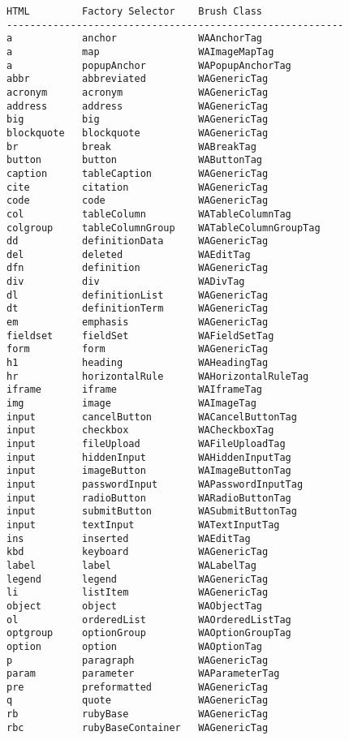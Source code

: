 \documentclass[a4paper,10pt,twoside]{book}
\begin{document}
\begin{lstlisting}
HTML         Factory Selector    Brush Class
----------------------------------------------------------
a            anchor              WAAnchorTag
a            map                 WAImageMapTag
a            popupAnchor         WAPopupAnchorTag
abbr         abbreviated         WAGenericTag
acronym      acronym             WAGenericTag
address      address             WAGenericTag
big          big                 WAGenericTag
blockquote   blockquote          WAGenericTag
br           break               WABreakTag
button       button              WAButtonTag
caption      tableCaption        WAGenericTag
cite         citation            WAGenericTag
code         code                WAGenericTag
col          tableColumn         WATableColumnTag
colgroup     tableColumnGroup    WATableColumnGroupTag
dd           definitionData      WAGenericTag
del          deleted             WAEditTag
dfn          definition          WAGenericTag
div          div                 WADivTag
dl           definitionList      WAGenericTag
dt           definitionTerm      WAGenericTag
em           emphasis            WAGenericTag
fieldset     fieldSet            WAFieldSetTag
form         form                WAGenericTag
h1           heading             WAHeadingTag
hr           horizontalRule      WAHorizontalRuleTag
iframe       iframe              WAIframeTag
img          image               WAImageTag
input        cancelButton        WACancelButtonTag
input        checkbox            WACheckboxTag
input        fileUpload          WAFileUploadTag
input        hiddenInput         WAHiddenInputTag
input        imageButton         WAImageButtonTag
input        passwordInput       WAPasswordInputTag
input        radioButton         WARadioButtonTag
input        submitButton        WASubmitButtonTag
input        textInput           WATextInputTag
ins          inserted            WAEditTag
kbd          keyboard            WAGenericTag
label        label               WALabelTag
legend       legend              WAGenericTag
li           listItem            WAGenericTag
object       object              WAObjectTag
ol           orderedList         WAOrderedListTag
optgroup     optionGroup         WAOptionGroupTag
option       option              WAOptionTag
p            paragraph           WAGenericTag
param        parameter           WAParameterTag
pre          preformatted        WAGenericTag
q            quote               WAGenericTag
rb           rubyBase            WAGenericTag
rbc          rubyBaseContainer   WAGenericTag

\end{lstlisting}
\end{document}

